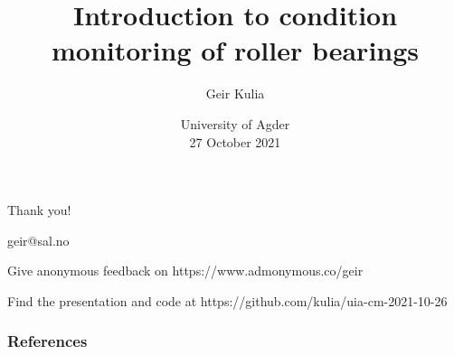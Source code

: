 \documentclass{beamer}
\title[Condition monitoring]{Introduction to condition monitoring of roller bearings}
\author{ Geir Kulia}
\date[UiA 27.10.21]{%
    University of Agder\\27 October 2021
}
\begin{document}

{
    \maketitle
}

% 















\begin{frame}
    \frametitle{}
    \centering
    
    Thank you!

    \vspace{0.5cm}
    geir@sal.no
    
    \vspace{0.5cm}
    
    Give anonymous feedback on
    https://www.admonymous.co/geir
    
    \vspace{0.5cm}
    Find the presentation and code at
    https://github.com/kulia/uia-cm-2021-10-26

\end{frame}

\begin{frame}
\frametitle{References}
\small

\end{frame}




\end{document}

